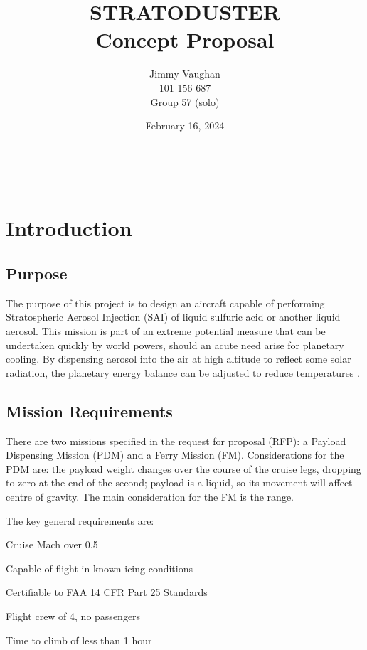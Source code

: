 \documentclass[12pt]{article}
\title{STRATODUSTER\\Concept Proposal}
\author{Jimmy Vaughan\\101 156 687\\Group 57 (solo)}
\date{February 16, 2024}
\newcounter{enumine}
\begin{document}
\maketitle
\thispagestyle{empty}
\setcounter{tocdepth}{2}
\vfill
\tableofcontents
\clearpage

~
\vfill
\listoffigures
\listoftables
\clearpage

\pagestyle{headings}

\section{Introduction}
\subsection{Purpose}
The purpose of this project is to design an aircraft capable of performing Stratospheric Aerosol Injection (SAI) \cite{Smith:2018aa} of liquid sulfuric acid or another liquid aerosol.
This mission is part of an extreme potential measure that can be undertaken quickly by world powers, should an acute need arise for planetary cooling.
By dispensing aerosol into the air at high altitude to reflect some solar radiation, the planetary energy balance can be adjusted to reduce temperatures \cite{Bradley:2023aa}.


\subsection{Mission Requirements}
There are two missions specified in the request for proposal (RFP): a Payload Dispensing Mission (PDM) and a Ferry Mission (FM). 
Considerations for the PDM are: the payload weight changes over the course of the cruise legs, dropping to zero at the end of the second; payload is a liquid, so its movement will affect centre of gravity.
The main consideration for the FM is the range.

The key general requirements are:
\begin{compactenum}
	\item Cruise Mach over 0.5
	\item Capable of flight in known icing conditions
	\item Certifiable to FAA 14 CFR Part 25 Standards
	\item Flight crew of 4, no passengers
	\item Time to climb of less than 1 hour
\setcounter{enumine}{\value{enumi}}
\end{compactenum}
\end{document}
